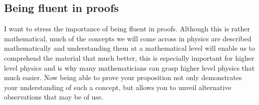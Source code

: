 \documentclass[12pt]{article}
\theoremstyle{break}
\begin{document}
\subsection{Being fluent in proofs}
I want to stress the importance of being fluent in proofs. Although this is rather mathematical, much of the concepts we will come across in physics are described mathematically and understanding them at a mathematical level will enable us to comprehend the material that much better, this is especially important for higher level physics and is why many mathematicians can grasp higher level physics that much easier. Now being able to prove your proposition not only demonstrates your understanding of such a concept, but allows you to unveil alternative observations that may be of use.
\end{document}
